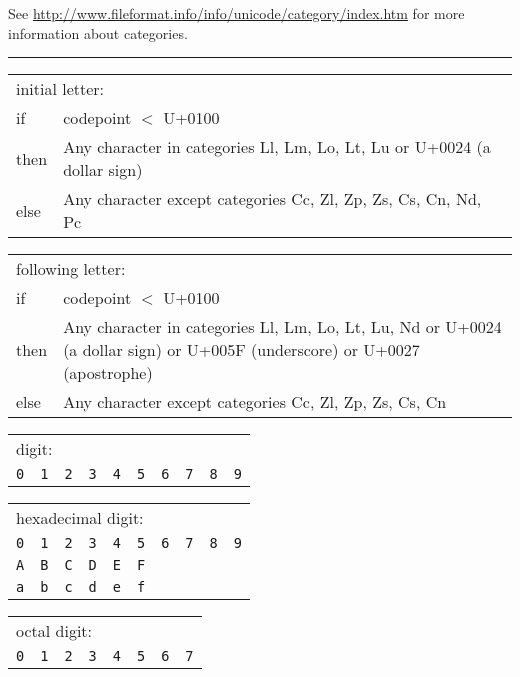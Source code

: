 \documentclass{overturerepchap}
\newcommand{\blankline}{\vspace{\baselineskip}}
\begin{document}
{See \url{http://www.fileformat.info/info/unicode/category/index.htm} for
more information about categories.

\begin{table}[ht]
\setlength{\tabcolsep}{3.5mm}
\setlength{\arraycolsep}{3.5mm}

\rule{\textwidth}{.5mm}
        \begin{tabular}{lp{13cm}}
        \multicolumn{2}{l}{\rm initial letter:} \\
        if   & codepoint $<$ U+0100 \\
        then &  Any character in categories Ll, Lm, Lo, Lt, Lu or U+0024 (a dollar sign) \\
        else & Any character except categories Cc, Zl, Zp, Zs, Cs,
                Cn, Nd, Pc \\
    \end{tabular}

\blankline
\begin{tabular}{lp{13cm}}
        \multicolumn{2}{l}{following letter: }\\
        if   & codepoint $<$ U+0100 \\
        then & Any character in categories Ll, Lm, Lo, Lt, Lu, Nd or
               U+0024 (a dollar sign) or U+005F (underscore) or U+0027 (apostrophe) \\
        else & Any character except categories Cc, Zl, Zp, Zs, Cs, Cn
    \end{tabular}

\blankline
    \begin{tabular}{*{10}{l}}
        \multicolumn{10}{l}{digit:} \\
        {\tt 0}
        & {\tt 1}
        & {\tt 2}
        & {\tt 3}
        & {\tt 4}
        & {\tt 5}
        & {\tt 6}
        & {\tt 7}
        & {\tt 8}
        & {\tt 9}
     \end{tabular}

\blankline
    \begin{tabular}{*{10}{l}}
        \multicolumn{10}{l}{hexadecimal digit:} \\
        {\tt 0} & {\tt 1} & {\tt 2} & {\tt 3} & {\tt 4} & {\tt 5} & {\tt 6} & {\tt 7} & {\tt 8} & {\tt 9} \\
        {\tt A} & {\tt B} & {\tt C} & {\tt D} & {\tt E} & {\tt F} \\
        {\tt a} & {\tt b} & {\tt c} & {\tt d} & {\tt e} & {\tt f}
     \end{tabular}

\blankline
    \begin{tabular}{*{8}{l}}
        \multicolumn{8}{l}{octal digit:} \\
        {\tt 0}
        & {\tt 1}
        & {\tt 2}
        & {\tt 3}
        & {\tt 4}
        & {\tt 5}
        & {\tt 6}
        & {\tt 7}
     \end{tabular}


\end{table}}
\end{document}
